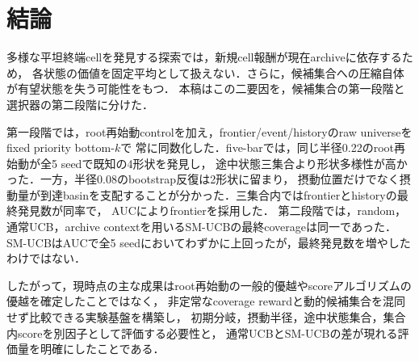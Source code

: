 \documentclass[a4paper,11pt]{ltjsarticle}
\begin{document}
\section{結論}

多様な平坦終端cellを発見する探索では，新規cell報酬が現在archiveに依存するため，
各状態の価値を固定平均として扱えない．さらに，候補集合への圧縮自体が有望状態を失う可能性をもつ．
本稿はこの二要因を，候補集合の第一段階と選択器の第二段階に分けた．

第一段階では，root再始動controlを加え，frontier/event/historyのraw universeをfixed priority bottom-\(k\)で
常に同数化した．five-barでは，同じ半径0.22のroot再始動が全5 seedで既知の4形状を発見し，
途中状態三集合より形状多様性が高かった．一方，半径0.08のbootstrap反復は2形状に留まり，
摂動位置だけでなく摂動量が到達basinを支配することが分かった．三集合内ではfrontierとhistoryの最終発見数が同率で，
AUCによりfrontierを採用した．
第二段階では，random，通常UCB，archive contextを用いるSM-UCBの最終coverageは同一であった．
SM-UCBはAUCで全5 seedにおいてわずかに上回ったが，最終発見数を増やしたわけではない．

したがって，現時点の主な成果はroot再始動の一般的優越やscoreアルゴリズムの優越を確定したことではなく，
非定常なcoverage rewardと動的候補集合を混同せず比較できる実験基盤を構築し，
初期分岐，摂動半径，途中状態集合，集合内scoreを別因子として評価する必要性と，
通常UCBとSM-UCBの差が現れる評価量を明確にしたことである．



\end{document}
